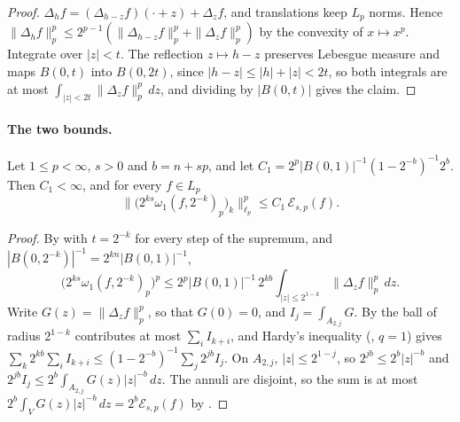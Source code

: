 \begin{proof}
\leanok
$\Delta_h f = (\Delta_{h - z} f)(\cdot + z) + \Delta_z f$, and translations keep $L_p$ norms.
Hence $\|\Delta_h f\|_p^p \leq 2^{p-1} (\|\Delta_{h-z} f\|_p^p + \|\Delta_z f\|_p^p)$ by the
convexity of $x \mapsto x^p$. Integrate over $|z| < t$. The reflection $z \mapsto h - z$
preserves Lebesgue measure and maps $B(0, t)$ into $B(0, 2t)$, since
$|h - z| \leq |h| + |z| < 2t$, so both integrals are at most
$\int_{|z| < 2t} \|\Delta_z f\|_p^p \, dz$, and dividing by $|B(0, t)|$ gives the claim.
\end{proof}

\paragraph{The two bounds.}

\begin{theorem}
\label{thm:modulus-by-slobodeckij-form}
\leanok
{}
Let $1 \leq p < \infty$, $s > 0$ and $b = n + sp$, and let
$C_1 = 2^p |B(0, 1)|^{-1} (1 - 2^{-b})^{-1} 2^b$. Then $C_1 < \infty$, and for every
$f \in L_p$
\[
  \bigl\| \bigl(2^{ks} \omega_1(f, 2^{-k})_p\bigr)_k \bigr\|_{\ell_p}^p
  \leq C_1 \, \mathcal{E}_{s,p}(f) .
\]
\end{theorem}

\begin{proof}
\leanok
By  with $t = 2^{-k}$ for every step of the supremum, and
$|B(0, 2^{-k})|^{-1} = 2^{kn} |B(0, 1)|^{-1}$,
\[
  \bigl(2^{ks} \omega_1(f, 2^{-k})_p\bigr)^p \leq 2^p |B(0, 1)|^{-1} \, 2^{kb}
  \int_{|z| \leq 2^{1-k}} \|\Delta_z f\|_p^p \, dz .
\]
Write $G(z) = \|\Delta_z f\|_p^p$, so that $G(0) = 0$, and $I_j = \int_{A_{2, j}} G$. By
 the ball of radius $2^{1-k}$ contributes at most $\sum_{i} I_{k+i}$,
and Hardy's inequality (, $q = 1$) gives
$\sum_k 2^{kb} \sum_i I_{k+i} \leq (1 - 2^{-b})^{-1} \sum_j 2^{jb} I_j$. On $A_{2, j}$,
$|z| \leq 2^{1-j}$, so $2^{jb} \leq 2^b |z|^{-b}$ and
$2^{jb} I_j \leq 2^b \int_{A_{2, j}} G(z) |z|^{-b} \, dz$. The annuli are disjoint, so the sum
is at most $2^b \int_V G(z) |z|^{-b} \, dz = 2^b \mathcal{E}_{s,p}(f)$ by
.
\end{proof}

